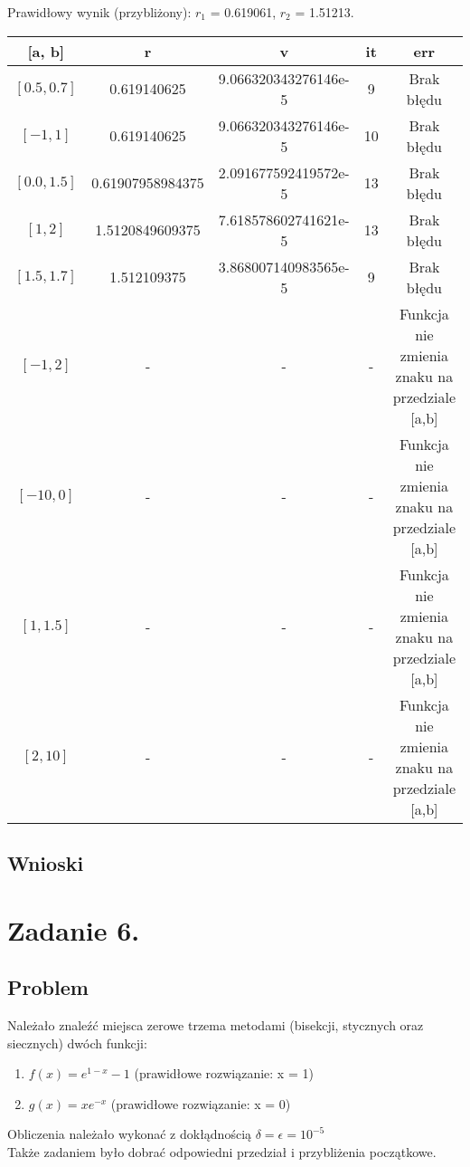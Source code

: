 \documentclass[11pt, a4paper]{article}
\begin{document}
    Prawidłowy wynik (przybliżony): $r_{1}$ = 0.619061, $r_{2}$ = 1.51213.
    \begin{center}
        \begin{tabular}{c|c|c|c|c}
            [a, b] & r & v & it & err\\
            \hline
            $[0.5, 0.7]$ & 0.619140625 & 9.066320343276146e-5 & 9 & Brak błędu\\
            $[-1, 1]$ & 0.619140625 & 9.066320343276146e-5 & 10 & Brak błędu\\
            $[0.0, 1.5]$ & 0.61907958984375 & 2.091677592419572e-5 & 13 & Brak błędu\\
            $[1, 2]$ & 1.5120849609375 & 7.618578602741621e-5 & 13 & Brak błędu\\
            $[1.5, 1.7]$ & 1.512109375 & 3.868007140983565e-5 & 9 & Brak błędu\\
            $[-1, 2]$ & - & - & - & Funkcja nie zmienia znaku na przedziale [a,b]\\
            $[-10, 0]$ & - & - & - & Funkcja nie zmienia znaku na przedziale [a,b]\\
            $[1, 1.5]$ & - & - & - & Funkcja nie zmienia znaku na przedziale [a,b]\\
            $[2, 10]$ & - & - & - & Funkcja nie zmienia znaku na przedziale [a,b]
        \end{tabular}
    \end{center}
    \subsection{Wnioski}

    \section{Zadanie 6.}
    \subsection{Problem}
    Należało znaleźć miejsca zerowe trzema metodami (bisekcji, stycznych oraz siecznych) dwóch funkcji:
    \begin{enumerate}
        \item $f(x) = e^{1-x} - 1$ (prawidłowe rozwiązanie: x = 1)
        \item $g(x) = xe^{-x}$ (prawidłowe rozwiązanie: x = 0)
    \end{enumerate}
    Obliczenia należało wykonać z dokłądnością $\delta = \epsilon = 10^{-5}$\\
    Także zadaniem było dobrać odpowiedni przedział i przybliżenia początkowe.
\end{document}
